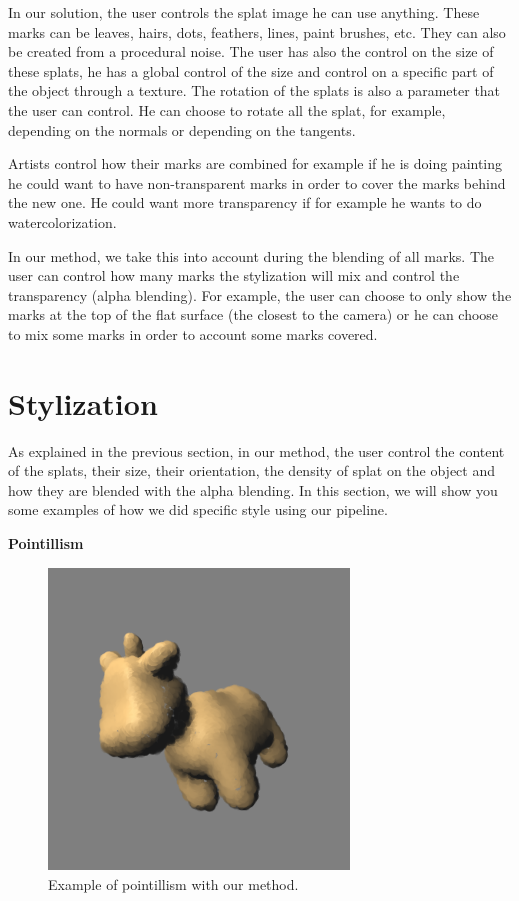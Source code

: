 In our solution, the user controls the splat image he can use anything. These marks can be leaves, hairs, dots, feathers, lines, paint brushes, etc. They can also be created from a procedural noise. The user has also the control on the size of these splats, he has a global control of the size and control on a specific part of the object through a texture. The rotation of the splats is also a parameter that the user can control. He can choose to rotate all the splat, for example, depending on the normals or depending on the tangents. \newline

Artists control how their marks are combined for example if he is doing painting he could want to have non-transparent marks in order to cover the marks behind the new one. He could want more transparency if for example he wants to do watercolorization.\newline

In our method, we take this into account during the blending of all marks. The user can control how many marks the stylization will mix and control the transparency (alpha blending). For example, the user can choose to only show the marks at the top of the flat surface (the closest to the camera) or he can choose to mix some marks in order to account some marks covered.


\section{Stylization}

As explained in the previous section, in our method, the user control the content of the splats, their size, their orientation, the density of splat on the object and how they are blended with the alpha blending. In this section, we will show you some examples of how we did specific style using our pipeline. \newline

\textbf{Pointillism}

\begin{figure}
    \begin{center}
    \includegraphics[width=80mm, height=80mm]{Resultats/spotPoint/final.png}
    \end{center}
    \caption{Example of pointillism with our method.}
    \label{final_point}
\end{figure}

